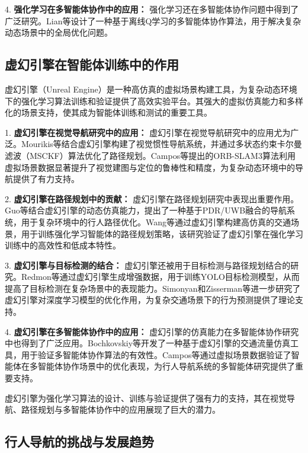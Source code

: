 4. \textbf{强化学习在多智能体协作中的应用：} 强化学习还在多智能体协作问题中得到了广泛研究。Lian等\cite{lian2023inverseql}设计了一种基于离线Q学习的多智能体协作算法，用于解决复杂动态场景中的全局优化问题。

\subsection{虚幻引擎在智能体训练中的作用}

虚幻引擎（Unreal Engine）是一种高仿真的虚拟场景构建工具，为复杂动态环境下的强化学习算法训练和验证提供了高效实验平台。其强大的虚拟仿真能力和多样化的场景支持，使其成为智能体训练和测试的重要工具。

1. \textbf{虚幻引擎在视觉导航研究中的应用：} 虚幻引擎在视觉导航研究中的应用尤为广泛。Mourikis等\cite{mourikis2007msckf}结合虚幻引擎构建了视觉惯性导航系统，并通过多状态约束卡尔曼滤波（MSCKF）算法优化了路径规划。Campos等\cite{campos2021orbslam3}提出的ORB-SLAM3算法利用虚拟场景数据显著提升了视觉建图与定位的鲁棒性和精度，为复杂动态环境中的导航提供了有力支持。

2. \textbf{虚幻引擎在路径规划中的贡献：} 虚幻引擎在路径规划研究中表现出重要作用。Guo等\cite{guo2020pdr}结合虚幻引擎的动态仿真能力，提出了一种基于PDR/UWB融合的导航系统，用于复杂环境中的行人路径优化。Wang等\cite{wang2023llio}通过虚幻引擎构建高仿真的交通场景，用于训练强化学习智能体的路径规划策略，该研究验证了虚幻引擎在强化学习训练中的高效性和低成本特性。

3. \textbf{虚幻引擎与目标检测的结合：} 虚幻引擎还被用于目标检测与路径规划结合的研究。Redmon等\cite{redmon2017yolo9000}通过虚幻引擎生成增强数据，用于训练YOLO目标检测模型，从而提高了目标检测在复杂场景中的表现能力。Simonyan和Zisserman等\cite{simonyan2014action}进一步研究了虚幻引擎对深度学习模型的优化作用，为复杂交通场景下的行为预测提供了理论支持。

4. \textbf{虚幻引擎在多智能体协作中的应用：} 虚幻引擎的仿真能力在多智能体协作研究中也得到了广泛应用。Bochkovskiy等\cite{bochkovskiy2020yolov4}开发了一种基于虚幻引擎的交通流量仿真工具，用于验证多智能体协作算法的有效性。Campos等\cite{campos2021orbslam3}通过虚拟场景数据验证了智能体在多智能体协作场景中的优化表现，为行人导航系统的多智能体研究提供了重要支持。

虚幻引擎为强化学习算法的设计、训练与验证提供了强有力的支持，其在视觉导航、路径规划与多智能体协作中的应用展现了巨大的潜力。

\subsection{行人导航的挑战与发展趋势}

